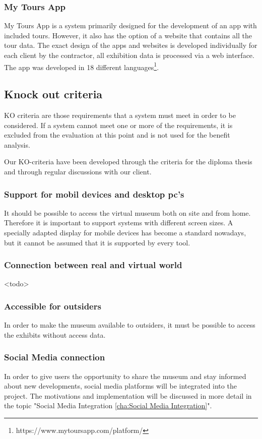\subsubsection{My Tours App}
My Tours App is a system primarily designed for the development of an app with included tours. However, it also has the option of a website that contains all the tour data. The exact design of the apps and websites is developed individually for each client by the contractor, all exhibition data is processed via a web interface. The app was developed in 18 different languages\footnote{https://www.mytoursapp.com/platform/}.

\subsection{Knock out criteria}
KO criteria are those requirements that a system must meet in order to be considered. If a system cannot meet one or more of the requirements, it is excluded from the evaluation at this point and is not used for the benefit analysis.

Our KO-criteria have been developed through the criteria for the diploma thesis and through regular discussions with our client.

\subsubsection{Support for mobil devices and desktop pc's}
It should be possible to access the virtual museum both on site and from home. Therefore it is important to support systems with different screen sizes. A specially adapted display for mobile devices has become a standard nowadays, but it cannot be assumed that it is supported by every tool.

\subsubsection{Connection between real and virtual world}
<todo>

\subsubsection{Accessible for outsiders}
In order to make the museum available to outsiders, it must be possible to access the exhibits without access data.

\subsubsection{Social Media connection}
In order to give users the opportunity to share the museum and stay informed about new developments, social media platforms will be integrated into the project. The motivations and implementation will be discussed in more detail in the topic "Social Media Integration \ref{cha:Social Media Integration}".

